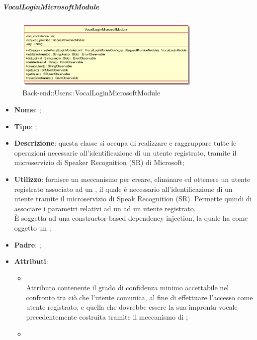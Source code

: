 \hypertarget{VocalLoginMicrosoftModule_label}{\subparagraph{VocalLoginMicrosoftModule}}
\begin{figure}[h]
	\centering
	\includegraphics[width=0.80\textwidth,height=\textheight,keepaspectratio]{images/ClassVocalLoginMicrosoftModule.png}
	\caption{Back-end::Users::VocalLoginMicrosoftModule}
\end{figure}
\begin{itemize}
	\item \textbf{Nome}: ;
	\item \textbf{Tipo}: ;
	\item \textbf{Descrizione}: questa classe si occupa di realizzare e raggruppare tutte le operazioni necessarie all'identificazione di un utente registrato, tramite il microservizio di Speaker Recognition (SR) di Microsoft;
	\item \textbf{Utilizzo}: fornisce un meccanismo per creare, eliminare ed ottenere un utente registrato associato ad un , il quale è necessario all'identificazione di un utente tramite il microservizio di Speak Recognition (SR). Permette quindi di associare i parametri relativi ad un  ad un utente registrato.\\
È soggetta ad una constructor-based dependency injection, la quale ha come oggetto un ;
	\item \textbf{Padre}: ;
	\item \textbf{Attributi}:
	\begin{itemize}
		\item[]  \\
		Attributo contenente il grado di confidenza minimo accettabile nel confronto tra ciò che l'utente comunica, al fine di effettuare l'accesso come utente registrato, e quella che dovrebbe essere la sua impronta vocale precedentemente costruita tramite il meccanismo di ;
		\item[]  \\

\end{itemize}
\end{itemize}

